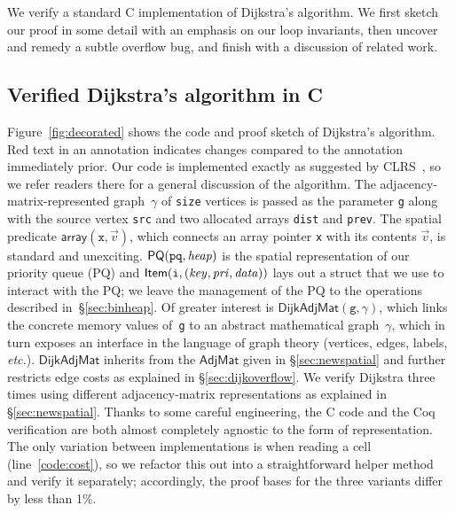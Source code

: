 We verify a standard C implementation of Dijkstra's algorithm.
We first sketch our proof in some detail with an emphasis on our loop invariants,
then uncover and remedy a subtle overflow bug, and finish with a discussion
of related work.

\subsection{Verified Dijkstra's algorithm in C}
\label{sec:dijkoverview}

Figure~\ref{fig:decorated} shows the code and proof
sketch of Dijkstra's algorithm.
{\color{red}Red} text in an annotation indicates changes compared to the
annotation immediately prior.
Our code is implemented exactly
as suggested by CLRS~\cite{clrs}, so we refer readers there for a
general discussion of the algorithm.
The adjacency-matrix-represented graph~$\gamma$ of \texttt{size} vertices
is passed as the parameter \texttt{g} along with the source vertex \texttt{src}
and two allocated arrays \texttt{dist} and \texttt{prev}.
The spatial predicate $\mathsf{array}(\texttt{x},\vec{v})$, which connects
an array pointer \texttt{x} with its contents $\vec{v}$, is standard and unexciting.
$\mathsf{PQ}(\texttt{pq},\mathit{heap})$ is the spatial
representation of our priority queue (PQ) and
$\mathsf{Item}(\texttt{i},\mathit{(key, pri, data)})$
lays out a struct that we use to interact with the PQ;
we leave the management of the PQ to the operations described in~\S\ref{sec:binheap}.
Of greater interest is $\mathsf{DijkAdjMat}(\texttt{g},\gamma)$, which
links the concrete memory values of~\texttt{g} to an abstract mathematical
graph~$\gamma$, which in turn exposes an interface in the
language of graph theory (vertices, edges, labels, \emph{etc.}).
$\mathsf{DijkAdjMat}$ inherits from the $\mathsf{AdjMat}$ given in \S\ref{sec:newspatial}
and further restricts edge costs as explained in \S\ref{sec:dijkoverflow}.
We verify Dijkstra
three times using different adjacency-matrix representations as explained in \S\ref{sec:newspatial}.
Thanks to some careful engineering, the C code and
the Coq verification are both almost completely agnostic to
the form of representation. The only variation between implementations
is when reading a cell (line~\ref{code:cost}), so we
refactor this out into a straightforward helper method and
verify it separately; accordingly, the proof bases for the three variants differ by less than 1\%.

